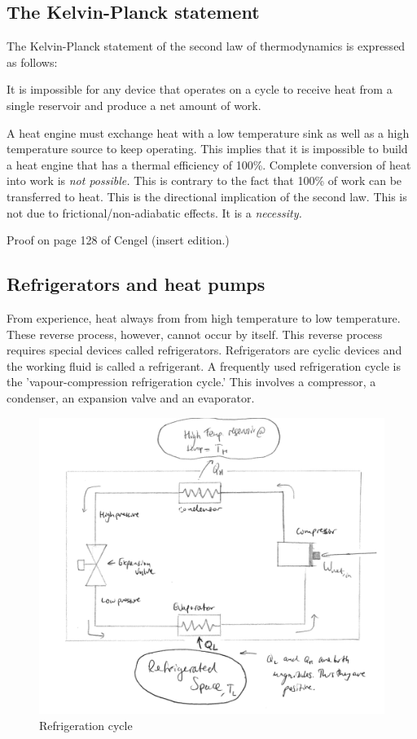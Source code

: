 \documentclass[class=report, crop=false, 12pt,a4paper]{standalone}
\begin{document}
\subsection{The Kelvin-Planck statement}
The Kelvin-Planck statement of the second law of thermodynamics is expressed as follows:
\begin{center}
  It is impossible for any device that operates on a cycle to receive heat from a single reservoir and produce a net amount of work.
\end{center}
A heat engine must exchange heat with a low temperature sink as well as a high temperature source to keep operating. This implies that it is impossible to build a heat engine that has a thermal efficiency of 100\%. Complete conversion of heat into work is \emph{not possible.} This is contrary to the fact that 100\% of work can be transferred to heat. This is the directional implication of the second law. This is not due to frictional/non-adiabatic effects. It is a \emph{necessity.}

Proof on page 128 of Cengel (insert edition.)
\subsection{Refrigerators and heat pumps}
From experience, heat always from from high temperature to low temperature. These reverse process, however, cannot occur by itself. This reverse process requires special devices called refrigerators. Refrigerators are cyclic devices and the working fluid is called a refrigerant. A frequently used refrigeration cycle is the 'vapour-compression refrigeration cycle.' This involves a compressor, a condenser, an expansion valve and an evaporator.
\begin{figure}[H]
  \centering
    \includegraphics[width = \textwidth]{../img/RefrigerationCycle}
    \caption{Refrigeration cycle}
\end{figure}
\end{document}
